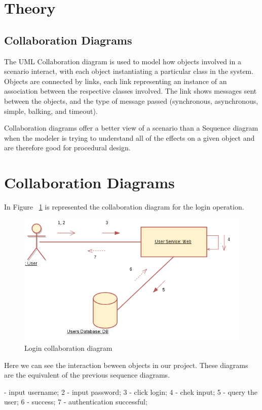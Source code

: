 \documentclass[12pt,a4paper,titlepage]{article}
\begin{document}
\section{Theory}

\subsection{Collaboration Diagrams}
The UML Collaboration diagram is used to model how objects involved in a scenario interact, with each object instantiating a particular class in the system. Objects are connected by links, each link representing an instance of an association between the respective classes involved. The link shows messages sent between the objects, and the type of message passed (synchronous, asynchronous, simple, balking, and timeout).\par
Collaboration diagrams offer a better view of a scenario than a Sequence diagram when the modeler is trying to understand all of the effects on a given object and are therefore good for procedural design.
\clearpage

\section{Collaboration Diagrams}
In Figure ~\ref{fig:login} is represented the collaboration diagram for the login operation.
\begin{figure}[H]
	\includegraphics[width=\textwidth]{login}
	\caption{Login collaboration diagram}
	\centering
	\label{fig:login}
\end{figure}
Here we can see the interaction beween objects in our project. These diagrams are the equivalent of the previous sequence diagrams.\par
{} - input username;
2 - input password;
3 - click login;
4 - chek input;
5 - query the user;
6 - success;
7 - authentication successful;
\end{document}
